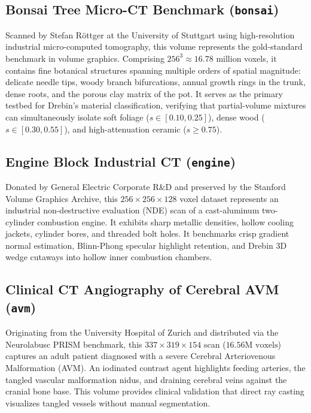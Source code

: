 \documentclass[10pt,twocolumn,a4paper]{article}
\begin{document}
\subsection{Bonsai Tree Micro-CT Benchmark (\texttt{bonsai})}
Scanned by Stefan R\"ottger at the University of Stuttgart using high-resolution industrial micro-computed tomography, this volume represents the gold-standard benchmark in volume graphics. Comprising $256^3 \approx 16.78\text{ million}$ voxels, it contains fine botanical structures spanning multiple orders of spatial magnitude: delicate needle tips, woody branch bifurcations, annual growth rings in the trunk, dense roots, and the porous clay matrix of the pot. It serves as the primary testbed for Drebin's material classification, verifying that partial-volume mixtures can simultaneously isolate soft foliage ($s \in [0.10, 0.25]$), dense wood ($s \in [0.30, 0.55]$), and high-attenuation ceramic ($s \ge 0.75$).

\subsection{Engine Block Industrial CT (\texttt{engine})}
Donated by General Electric Corporate R\&D and preserved by the Stanford Volume Graphics Archive, this $256 \times 256 \times 128$ voxel dataset represents an industrial non-destructive evaluation (NDE) scan of a cast-aluminum two-cylinder combustion engine. It exhibits sharp metallic densities, hollow cooling jackets, cylinder bores, and threaded bolt holes. It benchmarks crisp gradient normal estimation, Blinn-Phong specular highlight retention, and Drebin 3D wedge cutaways into hollow inner combustion chambers.

\subsection{Clinical CT Angiography of Cerebral AVM (\texttt{avm})}
Originating from the University Hospital of Zurich and distributed via the Neurolabusc PRISM benchmark, this $337 \times 319 \times 154$ scan ($16.56\text{M voxels}$) captures an adult patient diagnosed with a severe Cerebral Arteriovenous Malformation (AVM). An iodinated contrast agent highlights feeding arteries, the tangled vascular malformation nidus, and draining cerebral veins against the cranial bone base. This volume provides clinical validation that direct ray casting visualizes tangled vessels without manual segmentation.
\end{document}
